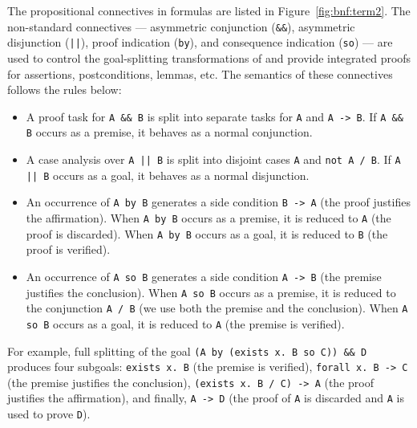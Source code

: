 The propositional connectives in \whyml formulas are listed in
Figure~\ref{fig:bnf:term2}. The non-standard connectives ---
asymmetric conjunction (\texttt{\&\&}), asymmetric disjunction
(\texttt{||}), proof indication (\texttt{by}), and consequence
indication (\texttt{so}) --- are used to control the goal-splitting
transformations of \why and provide integrated proofs for
\whyml assertions, postconditions, lemmas, etc.
The semantics of these connectives
follows the rules below:
\begin{itemize}\setlength{\itemsep}{0ex}
\item A proof task for \texttt{A \&\& B} is split into
separate tasks for \texttt{A} and \texttt{A -> B}.
If \texttt{A \&\& B} occurs as a premise, it behaves
as a normal conjunction.
\item A case analysis over \texttt{A || B} is split into
disjoint cases \texttt{A} and \texttt{not A {/} B}.
If \texttt{A || B} occurs as a goal, it behaves
as a normal disjunction.
\item An occurrence of \texttt{A by B} generates a side condition
\texttt{B -> A} (the proof justifies the affirmation).
When \texttt{A by B} occurs as a premise,
it is reduced to \texttt{A} (the proof is discarded).
When \texttt{A by B} occurs as a goal,
it is reduced to \texttt{B} (the proof is verified).
\item An occurrence of \texttt{A so B} generates a side condition
\texttt{A -> B} (the premise justifies the conclusion).
When \texttt{A so B} occurs as a premise,
it is reduced to the conjunction \mbox{\texttt{A {/} B}}
(we use both the premise and the conclusion).
When \texttt{A so B} occurs as a goal,
it is reduced to \texttt{A} (the premise is verified).
\end{itemize}
For example, full splitting of the goal
\texttt{(A by (exists x. B so C)) \&\& D}
produces four subgoals:
\texttt{exists x. B} (the premise is verified),
\texttt{forall x. B -> C} (the premise justifies the conclusion),
\texttt{(exists x. B {/} C) -> A} (the proof justifies the affirmation),
and finally, \texttt{A -> D} (the proof of \texttt{A} is discarded
and \texttt{A} is used to prove \texttt{D}).

